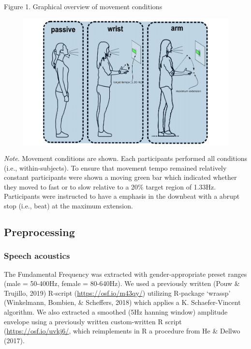 \documentclass[
  man, noextraspace,floatsintext]{apa6}
\begin{document}
Figure 1. Graphical overview of movement conditions

\begin{figure}

{\centering \includegraphics{GS_physics_in_fluid_speech_files/figure-latex/method_stance_pic-1} 

}

\end{figure}

\emph{Note}. Movement conditions are shown. Each participants performed all conditions (i.e., within-subjects). To ensure that movement tempo remained relatively constant participants were shown a moving green bar which indicated whether they moved to fast or to slow relative to a 20\% target region of 1.33Hz. Participants were instructed to have a emphasis in the downbeat with a abrupt stop (i.e., beat) at the maximum extension.

\hypertarget{preprocessing}{%
\subsection{Preprocessing}\label{preprocessing}}

\hypertarget{speech-acoustics}{%
\subsubsection{Speech acoustics}\label{speech-acoustics}}

The Fundamental Frequency was extracted with gender-appropriate preset ranges (male = 50-400Hz, female = 80-640Hz). We used a previously written (Pouw \& Trujillo, 2019) R-script (\url{https://osf.io/m43qy/}) utilizing R-package `wrassp' (Winkelmann, Bombien, \& Scheffers, 2018) which applies a K. Schaefer-Vincent algorithm. We also extracted a smoothed (5Hz hanning window) amplitude envelope using a previously written custom-written R script (\url{https://osf.io/uvkj6/}, which reimplements in R a procedure from He \& Dellwo (2017).
\end{document}
